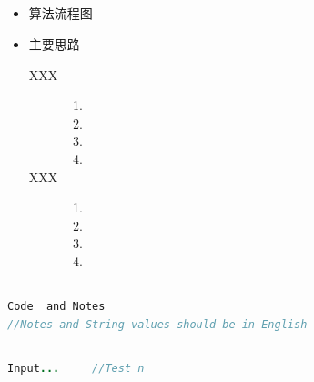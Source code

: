 \documentclass{article}
\begin{document}
\subsection{}
\begin{itemize}
	\item \kaishu 算法流程图
	\begin{center}
	\end{center}
	\item \kaishu 主要思路
	\begin{description}
		\item[\kaishu XXX]
			\begin{enumerate}
		\item[]\hspace{2pt}
				\item\kaishu
				\item\kaishu
				\item\kaishu
			\end{enumerate}
		\item[\kaishu XXX]
			\begin{enumerate}
				\item[]\hspace{2pt}
				\item\kaishu
				\item\kaishu
				\item\kaishu
			\end{enumerate}
	\end{description}
\end{itemize}

\subsection{}
\begin{center}
	\begin{lstlisting}[language = Java]
Code  and Notes        
//Notes and String values should be in English
	\end{lstlisting}
\end{center}


\subsection{}
\begin{center}
	\begin{lstlisting}[language = Java]
Input...     //Test n
	\end{lstlisting}
\end{center}
\end{document}

